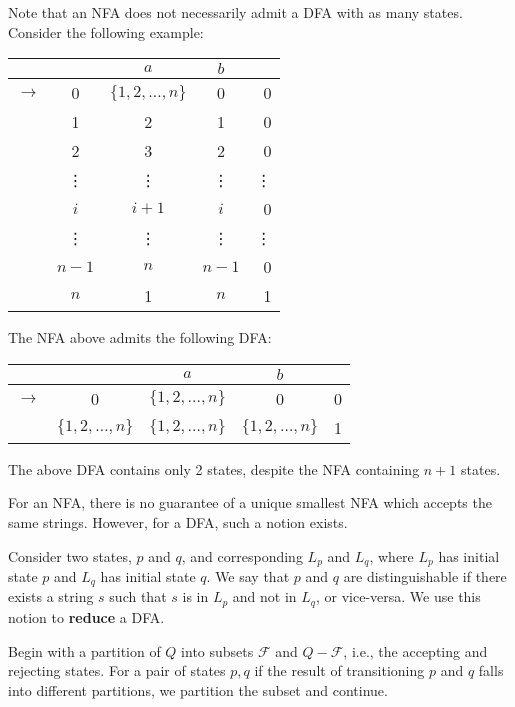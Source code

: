 Note that an NFA does not necessarily admit a DFA with as many states. Consider the following example:

\begin{center}\begin{tabular}{c c| c c r}
     & & $a$ & $b$ & \\\hline
$\to$&0&$\{1,2,\hdots,n\}$ & 0 & 0 \\
     & 1 & 2 & 1 & 0 \\
     & 2 & 3 & 2 & 0 \\
     & \vdots & \vdots & \vdots & \vdots \\
     & $i$ & $i + 1$ & $i$ & 0 \\
     & \vdots & \vdots & \vdots & \vdots \\
     & $n-1$ & $n$ & $n-1$ & 0 \\
     & $n$ & 1 & $n$ & 1
\end{tabular}\end{center}

The NFA above admits the following DFA:

\begin{center}\begin{tabular}{c c| c c r}
     & & $a$ & $b$ & \\\hline
$\to$&0&$\{1,2,\hdots,n\}$ & 0 & 0 \\
     & $\{1, 2,\hdots, n\}$ & $\{1, 2,\hdots, n\}$ & $\{1, 2,\hdots, n\}$ & 1 \\
\end{tabular}\end{center}

The above DFA contains only 2 states, despite the NFA containing $n+1$ states.

For an NFA, there is no guarantee of a unique smallest NFA which accepts the same strings. However, for a DFA, such a notion exists.

Consider two states, $p$ and $q$, and corresponding $L_p$ and $L_q$, where $L_p$ has initial state $p$ and $L_q$ has initial state $q$. We say that $p$ and $q$ are distinguishable if there exists a string $s$ such that $s$ is in $L_p$ and not in $L_q$, or vice-versa. We use this notion to \textbf{reduce} a DFA.

Begin with a partition of $Q$ into subsets $\mathcal{F}$ and $Q-\mathcal{F}$, i.e., the accepting and rejecting states. For a pair of states $p, q$ if the result of transitioning $p$ and $q$ falls into different partitions, we partition the subset and continue.

